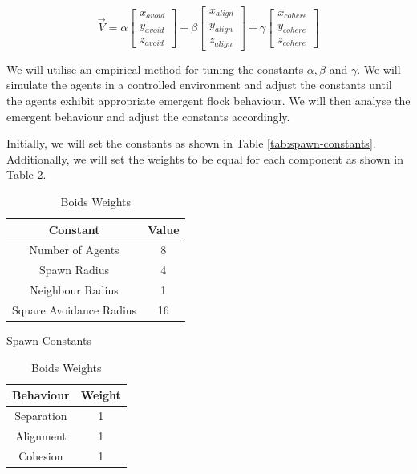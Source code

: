 \documentclass[12pt]{article}
\begin{document}
\begin{equation}
    \vec{V} = \alpha
    \begin{bmatrix}
    x_{avoid} \\
    y_{avoid} \\
    z_{avoid}
    \end{bmatrix}
    +
    \beta
    \begin{bmatrix}
    x_{align} \\
    y_{align} \\
    z_{align}
    \end{bmatrix}
    +
    \gamma
    \begin{bmatrix}
    x_{cohere} \\
    y_{cohere} \\
    z_{cohere}
    \end{bmatrix}
\end{equation}

We will utilise an empirical method for tuning the constants $\alpha, \beta$ and $\gamma$. We will simulate the agents in a controlled environment and adjust the constants until the agents exhibit appropriate emergent flock behaviour. We will then analyse the emergent behaviour and adjust the constants accordingly.

Initially, we will set the constants as shown in Table \ref{tab:spawn-constants}. Additionally, we will set the weights to be equal for each component as shown in Table \ref{tab:boids-weights}.

\begin{table}[ht]
    \begin{minipage}{0.45\textwidth}
        \centering
        \begin{tabular}{| c | c |} 
        \hline
        Constant & Value \\ 
        \hline\hline
        Number of Agents & 8 \\
        \hline
        Spawn Radius & 4 \\
        \hline
        Neighbour Radius & 1 \\
        \hline
        Square Avoidance Radius & 16 \\
        \hline
        \end{tabular}
        \caption{Spawn Constants}
        \label{tab:spawn-constants}
    \end{minipage}
    \hfill
    \begin{minipage}{0.45\textwidth}
        \centering
        \begin{tabular}{| c | c |} 
        \hline
        Behaviour & Weight \\ 
        \hline\hline
        Separation & 1 \\
        \hline
        Alignment & 1 \\
        \hline
        Cohesion & 1 \\
        \hline
        \end{tabular}
        \caption{Boids Weights}
        \label{tab:boids-weights}
    \end{minipage}
\end{table}
\end{document}

